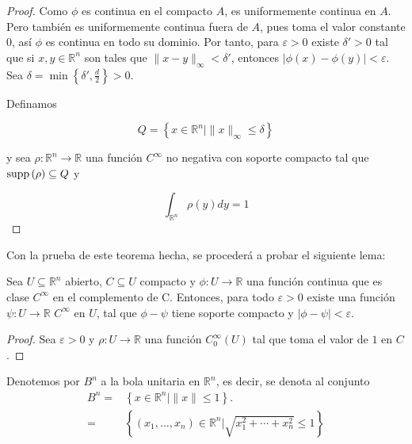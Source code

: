 \documentclass[12pt]{report}
\theoremstyle{largebreak}
\newcommand\abs[1]{\ensuremath{\lvert#1\rvert}}
\newcommand\cf[3]{\ensuremath{#1:#2\rightarrow#3}}
\newcommand\supp[1]{\ensuremath{\textup{supp}\left(#1\right)}}
\begin{document}
\begin{proof}
    Como $\phi$ es continua en el compacto $A$, es uniformemente continua en $A$. Pero también es uniformemente continua fuera de $A$, pues toma el valor constante $0$, así $\phi$ es continua en todo su dominio.
    Por tanto, para $\varepsilon>0$ existe $\delta'>0$ tal que si $x,y\in\mathbb{R}^n$ son tales que $\|x-y\|_{\infty}<\delta'$, entonces $\abs{\phi(x)-\phi(y)}<\varepsilon$. Sea $\delta =\min\left\{\delta',\frac{d}{2}\right\}>0$.

    Definamos
    
    \begin{equation*}
        Q=\left\{x\in\mathbb{R}^n|\|x\|_{\infty}\leq\delta\right\}
    \end{equation*}
    
    y sea $\cf{\rho}{\mathbb{R}^n}{\mathbb{R}}$ una función $C^{\infty}$ no negativa con soporte compacto tal que $\supp{\rho}\subseteq Q$ y
    
    \begin{equation*}
        \int_{\mathbb{R}^n}\rho(y)dy=1
    \end{equation*}



    \end{proof}

Con la prueba de este teorema hecha, se procederá a probar el siguiente lema:

\begin{lema}
    Sea $U\subseteq\mathbb{R}^n$ abierto, $C\subseteq U$ compacto y $\cf{\phi}{U}{\mathbb{R}}$ una función continua que es clase $C^{\infty}$ en el complemento de C. Entonces, para todo $\varepsilon > 0$ existe una función $\cf{\psi}{U}{\mathbb{R}}$ $C^{\infty}$ en $U$, tal que $\phi - \psi$ tiene soporte compacto y $\abs{\phi - \psi}<\varepsilon$.
\end{lema}

\begin{proof}
    Sea $\varepsilon>0$ y $\cf{\rho}{U}{\mathbb{R}}$ una función $C_0^{\infty}(U)$ tal que toma el valor de $1$ en $C$.
\end{proof}

Denotemos por $B^n$ a la bola unitaria en $\mathbb{R}^n$, es decir, se denota al conjunto
\begin{equation*}
    \begin{split}
        B^n=&\left\{x\in\mathbb{R}^n|\|x\|\leq 1\right\}.\\
        =&\left\{(x_1,\dots,x_n)\in\mathbb{R}^n|\sqrt{x_1^2+\cdots+x_n^2}\leq1\right\}
    \end{split}
\end{equation*}
\end{document}
